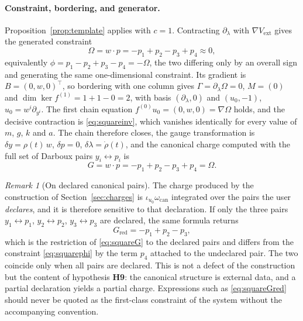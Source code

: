 \documentclass[12pt]{article}
\theoremstyle{plain}
\theoremstyle{definition}
\theoremstyle{remark}
\newtheorem{remark}[theorem]{Remark}
\newcommand{\Om}{\Omega}
\begin{document}
	\paragraph{Constraint, bordering, and generator.} Proposition~\ref{prop:template}
	applies with $c=1$. Contracting $\partial_{\lambda}$ with
	$\nabla V_{\mathrm{ext}}$ gives the generated constraint
	\begin{equation}
		\Om=w\!\cdot\!p=-p_{1}+p_{2}-p_{3}+p_{4}\approx0,
		\label{eq:squarephi}
	\end{equation}
	equivalently $\phi=p_{1}-p_{2}+p_{3}-p_{4}=-\Om$, the two differing only by an
	overall sign and generating the same one-dimensional constraint. Its gradient
	is $B=(0,w,0)^{\top}$, so bordering with one column gives
	$\Gamma=\partial_{\lambda}\Om=0$, $M=(0)$ and
	$\dim\ker f^{(1)}=1+1-0=2$, with basis $(\partial_{\lambda},0)$ and
	$(u_{0},-1)$, $u_{0}=w^{i}\partial_{y^{i}}$. The first chain equation
	$f^{(0)}u_{0}=(0,w,0)=\nabla\Om$ holds, and the decisive contraction is
	\eqref{eq:squareinv}, which vanishes identically for every value of $m$, $g$,
	$k$ and $a$. The chain therefore closes, the gauge transformation is
	$\delta y=\rho(t)\,w$, $\delta p=0$,
	$\delta\lambda=\dot\rho(t)$, and the canonical charge computed with the full set
	of Darboux pairs $y_{i}\leftrightarrow p_{i}$ is
	\begin{equation}
		G=w\!\cdot\!p=-p_{1}+p_{2}-p_{3}+p_{4}=\Om .
		\label{eq:squareG}
	\end{equation}
	
	\begin{remark}[On declared canonical pairs]
		\label{rem:pairs}
		The charge produced by the construction of Section~\ref{sec:charges} is
		$\iota_{u_{0}}\omega_{\mathrm{can}}$ integrated over the pairs the user
		\emph{declares}, and it is therefore sensitive to that declaration. If only the
		three pairs $y_{1}\leftrightarrow p_{1}$, $y_{2}\leftrightarrow p_{2}$,
		$y_{3}\leftrightarrow p_{3}$ are declared, the same formula returns
		\begin{equation}
			G_{\mathrm{red}}=-p_{1}+p_{2}-p_{3},
			\label{eq:squareGred}
		\end{equation}
		which is the restriction of \eqref{eq:squareG} to the declared pairs and differs
		from the constraint \eqref{eq:squarephi} by the term $p_{4}$ attached to the
		undeclared pair. The two coincide only when all pairs are declared. This is not
		a defect of the construction but the content of hypothesis \textbf{H9}: the
		canonical structure is external data, and a partial declaration yields a partial
		charge. Expressions such as \eqref{eq:squareGred} should never be quoted as the
		first-class constraint of the system without the accompanying convention.
	\end{remark}
	
\end{document}

